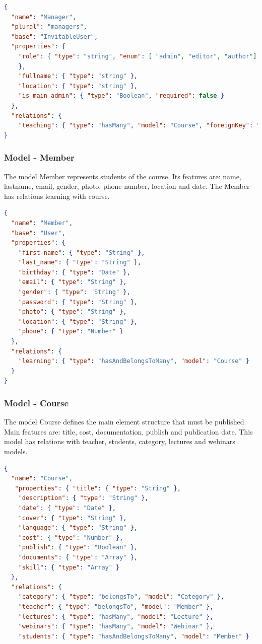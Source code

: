 \begin{lstlisting}[language=json]
{
  "name": "Manager",
  "plural": "managers",
  "base": "InvitableUser",
  "properties": {
    "role": { "type": "string", "enum": [ "admin", "editor", "author"]
    },
    "fullname": { "type": "string" },
    "location": { "type": "string" },
    "is_main_admin": { "type": "Boolean", "required": false }
  },
  "relations": {
    "teaching": { "type": "hasMany", "model": "Course", "foreignKey": "teacher_id" }
}
\end{lstlisting}


\subsubsection{ Model - Member}

The model Member represents students of the course. Its features are: name, lastname, email, gender, photo, phone number, location and date. The Member has relations learning with course.

\begin{lstlisting}[language=json]
{
  "name": "Member",
  "base": "User",
  "properties": {
    "first_name": { "type": "String" },
    "last_name": { "type": "String" },   
    "birthday": { "type": "Date" },
    "email": { "type": "String" },
    "gender": { "type": "String" },
    "password": { "type": "String" },
    "photo": { "type": "String" },
    "location": { "type": "String" },
    "phone": { "type": "Number" }
  },
  "relations": {
    "learning": { "type": "hasAndBelongsToMany", "model": "Course" }  
  }
}
\end{lstlisting}


\subsubsection{ Model - Course}

The model Course defines the main element structure that must be published. Main features are: title, cost, documentation, publish and publication date. This model has relations with teacher, students, category, lectures and webinars models.


\begin{lstlisting}[language=json]
{
  "name": "Course",
   "properties": { "title": { "type": "String" },
    "description": { "type": "String" },
    "date": { "type": "Date" },
    "cover": { "type": "String" },
    "language": { "type": "String" },
    "cost": { "type": "Number" },
    "publish": { "type": "Boolean" },
    "documents": { "type": "Array" },
    "skill": { "type": "Array" }
  },
  "relations": {
    "category": { "type": "belongsTo", "model": "Category" },
    "teacher": { "type": "belongsTo", "model": "Member" },
    "lectures": { "type": "hasMany", "model": "Lecture" },
    "webinars": { "type": "hasMany", "model": "Webinar" },
    "students": { "type": "hasAndBelongsToMany", "model": "Member" }

\end{lstlisting}

